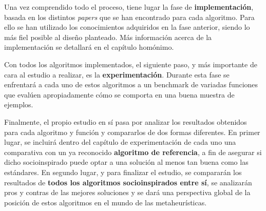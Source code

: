 Una vez comprendido todo el proceso, tiene lugar la fase de \textbf{implementación}, basada en los distintos \textit{papers} que se han encontrado para cada algoritmo. Para ello se han utilizado los conocimientos adquiridos en la fase anterior, siendo lo más fiel posible al diseño planteado. Más información acerca de la implementación se detallará en el capítulo homónimo.

Con todos los algoritmos implementados, el siguiente paso, y más importante de cara al estudio a realizar, es la \textbf{experimentación}. Durante esta fase se enfrentará a cada uno de estos algoritmos a un benchmark de variadas funciones que evalúen apropiadamente cómo se comporta en una buena muestra de ejemplos.

Finalmente, el propio estudio en sí pasa por analizar los resultados obtenidos para cada algoritmo y función y compararlos de dos formas diferentes. En primer lugar, se incluirá dentro del capítulo de experimentación de cada uno una comparativa con un ya reconocido \textbf{algoritmo de referencia}, a fin de asegurar si dicho socioinspirado puede optar a una solución al menos tan buena como las estándares. En segundo lugar, y para finalizar el estudio, se compararán los resultados de \textbf{todos los algoritmos socioinspirados entre sí}, se analizarán pros y contras de las mejores soluciones y se dará una perspectiva global de la posición de estos algoritmos en el mundo de las metaheurísticas.